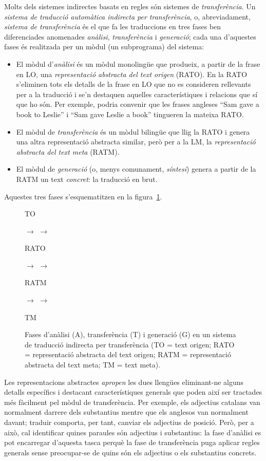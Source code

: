 Molts dels sistemes indirectes basats en regles són sistemes de
\emph{transferència}. Un \emph{sistema de traducció automàtica
  indirecta per transferència}, o, abreviadament, \emph{sistema de
  transferència} és el que fa les traduccions en tres fases ben
diferenciades anomenades \emph{anàlisi}, \emph{transferència} i
\emph{generació}; cada una d'aquestes fases és realitzada per un mòdul
(un subprograma) del sistema:
\begin{itemize}
\item El mòdul d'\emph{anàlisi} és un mòdul monolingüe que produeix, a
  partir de la frase en LO, una \emph{representació abstracta del text
    origen} (RATO). En la RATO s'eliminen tots els detalls de la frase
  en LO que no es consideren rellevants per a la traducció i se'n
  destaquen aquelles característiques i relacions que sí que ho són.
  Per exemple, podria convenir que les frases angleses ``Sam gave a
  book to Leslie'' i ``Sam gave Leslie a book'' \citep{arnold93j}
  tingueren la mateixa RATO.
\item El mòdul de \emph{transferència} és un mòdul bilingüe que llig
  la RATO i genera una altra representació abstracta similar, però per
  a la LM, la \emph{representació abstracta del text meta} (RATM).
\item El mòdul de \emph{generació} (o, menys comunament,
  \emph{síntesi}) genera a partir de la RATM un text \emph{concret}:
  la traducció en brut.
\end{itemize}
Aquestes tres fases s'esquematitzen en la figura~\ref{fg:transfer}.


\begin{figure}
\begin{center}
\parbox{0.5cm}{TO} $\to$
 $\to$ 
\parbox{1.0cm}{RATO} $\to$
 $\to$
\parbox{1.25cm}{RATM} $\to$
 $\to$
\parbox{0.5cm}{TM} 
\end{center}
\caption{Fases d'anàlisi (A), transferència (T) i generació (G) en un
  sistema de traducció indirecta per transferència (TO = text origen;
  RATO = representació abstracta del text origen; RATM = representació
  abstracta del text meta; TM = text meta).}
\label{fg:transfer} 
\end{figure}

Les representacions abstractes \emph{apropen} les dues llengües
eliminant-ne alguns detalls específics i destacant característiques
generals que poden així ser tractades més fàcilment pel mòdul de
transferència. Per exemple, els adjectius catalans van normalment
darrere dels substantius mentre que els anglesos van normalment
davant; traduir comporta, per tant, canviar els adjectius de
posició. Però, per a això, cal identificar quines paraules són
adjectius i substantius: la fase d'anàlisi es pot encarregar d'aquesta
tasca perquè la fase de transferència puga aplicar regles generals
sense preocupar-se de quins són els adjectius o els substantius
concrets.

